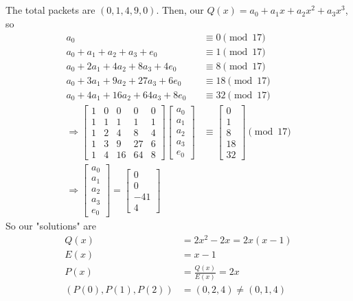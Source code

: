 \documentclass{article}
\begin{document}
\subsection{}

The total packets are \((0, 1, 4, 9, 0)\).
Then, our \(Q(x) = a_0 + a_1 x + a_2 x^2 + a_3 x^3\), so
\begin{align}
    a_0 &\equiv 0 \pmod{17} \\
    a_0 + a_1 + a_2 + a_3 + e_0 &\equiv 1 \pmod{17} \\
    a_0 + 2 a_1 + 4 a_2 + 8 a_3 + 4 e_0 &\equiv 8 \pmod{17} \\
    a_0 + 3 a_1 + 9 a_2 + 27 a_3 + 6 e_0 &\equiv 18 \pmod{17} \\
    a_0 + 4 a_1 + 16 a_2 + 64 a_3 + 8 e_0 &\equiv 32 \pmod{17} \\
    \Rightarrow
    \begin{bmatrix}
        1 & 0 & 0 & 0 & 0 \\
        1 & 1 & 1 & 1 & 1 \\
        1 & 2 & 4 & 8 & 4 \\
        1 & 3 & 9 & 27 & 6 \\
        1 & 4 & 16 & 64 & 8
    \end{bmatrix}
    \begin{bmatrix}
        a_0 \\
        a_1 \\
        a_2 \\
        a_3 \\
        e_0
    \end{bmatrix}
    &\equiv
    \begin{bmatrix}
        0 \\
        1 \\
        8 \\
        18 \\
        32 
    \end{bmatrix} \pmod{17} \\
    \Rightarrow
    \begin{bmatrix}
        a_0 \\
        a_1 \\
        a_2 \\
        a_3 \\
        e_0
    \end{bmatrix}
    =
    \begin{bmatrix}
        0 \\
        0 \\
        -4
        1 \\
        4
    \end{bmatrix}
\end{align}
So our "solutions" are
\begin{align}
    Q(x) &= 2x^2 - 2x = 2x (x - 1) \\
    E(x) &= x - 1 \\
    P(x) &= \frac{Q(x)}{E(x)} = 2x \\
    (P(0), P(1), P(2)) &= (0, 2, 4) \neq (0, 1, 4)
\end{align}
\end{document}
